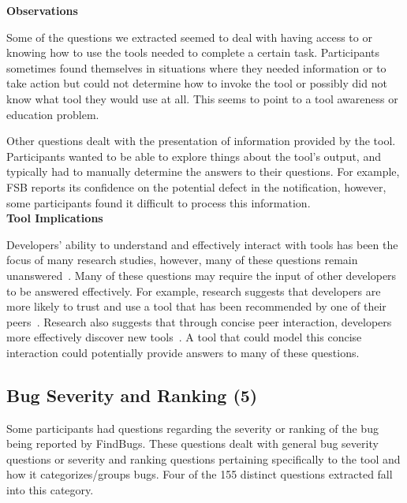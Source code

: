 \documentclass[conference]{IEEEtran}
\begin{document}
\noindent\textbf{Observations}

Some of the questions we extracted seemed to deal with having access to or knowing how to use the tools needed to complete a certain task. 
Participants sometimes found themselves in situations where they needed information or to take action but could not determine how to invoke the tool or possibly did not know what tool they would use at all. 
This seems to point to a tool awareness or education problem.

Other questions dealt with the presentation of information provided by the tool. 
Participants wanted to be able to explore things about the tool's output, and typically had to manually determine the answers to their questions. 
For example, FSB reports its confidence on the potential defect in the notification, however, some participants found it difficult to process this information.
\\


\noindent\textbf{Tool Implications}

Developers' ability to understand and effectively interact with tools has been the focus of many research studies, however, many of these questions remain unanswered~\cite{ko2004designing, khoo2008path, johnson2013don}. 
Many of these questions may require the input of other developers to be answered effectively. 
For example, research suggests that developers are more likely to trust and use a tool that has been recommended by one of their peers~\cite{murphy2010trust}.
Research also suggests that through concise peer interaction, developers more effectively discover new tools~\cite{murphy2011peer}. 
A tool that could model this concise interaction could potentially provide answers to many of these questions.





\noindent\subsection{\textbf{Bug Severity and Ranking (5)}}\label{bsr}

Some participants had questions regarding the severity or ranking of the bug being reported by FindBugs. 
These questions dealt with general bug severity questions or severity and ranking questions pertaining specifically to the tool and how it categorizes/groups bugs. 
Four of the 155 distinct questions extracted fall into this category. 
\\
\end{document}
